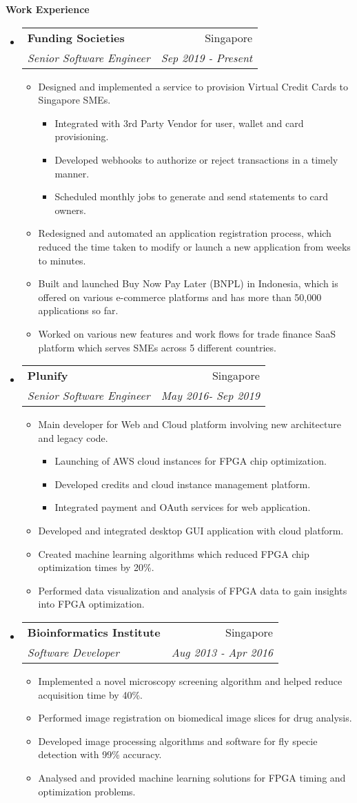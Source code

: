 \documentclass[letterpaper,11pt]{article}
\makeatletter
\newcommand{\resitem}[1]{\item #1 \vspace{-2pt}}
\newcommand{\resheading}[1]{{\large \colorbox{mygrey}{\begin{minipage}{\textwidth}{\textbf{#1 \vphantom{p\^{E}}}}\end{minipage}}}}
\newcommand{\ressubheading}[4]{
\begin{tabular*}{7.0in}{l@{\extracolsep{\fill}}r}
		\textbf{#1} & #2 \\
		\textit{#3} & \textit{#4} \\
\end{tabular*}\vspace{-6pt}}
\makeatother
\begin{document}
\resheading{Work Experience}
\begin{itemize}
\item
	\ressubheading{Funding Societies}{Singapore}{Senior Software Engineer}{Sep 2019 - Present}

	\begin{itemize}
		\resitem{Designed and implemented a service to provision Virtual Credit Cards to Singapore SMEs.}
		 \begin{itemize}
			\resitem{Integrated with 3rd Party Vendor for user,  wallet and card provisioning.}
			\resitem{Developed webhooks to authorize or reject transactions in a timely manner.}
			\resitem{Scheduled monthly jobs to generate and send statements to card owners.}
		\end{itemize}
		\resitem{Redesigned and automated an application registration process,  which reduced the time taken to modify or launch a new application from weeks to minutes.}
		\resitem{Built and launched Buy Now Pay Later (BNPL) in Indonesia, which is offered on various e-commerce platforms and has more than 50,000 applications so far.}
		\resitem{Worked on various new features and work flows for trade finance SaaS platform which serves SMEs across 5 different countries.}
	\end{itemize}


\item
	\ressubheading{Plunify}{Singapore}{Senior Software Engineer}{May 2016- Sep 2019}
	\begin{itemize}
	    \resitem{Main developer for Web and Cloud platform involving new architecture and legacy code.}
	    \begin{itemize}
			\resitem{Launching of AWS cloud instances for FPGA chip optimization.}
			\resitem{Developed credits and cloud instance management platform.}
			\resitem{Integrated payment and OAuth services for web application.}
	    \end{itemize}
	    \resitem{Developed and integrated desktop GUI application with cloud platform.}
		\resitem{Created machine learning algorithms which reduced FPGA chip optimization times by 20\%.}
		\resitem{Performed data visualization and analysis of FPGA data to gain insights into FPGA optimization.}
	\end{itemize}


\item
	\ressubheading{Bioinformatics Institute}{Singapore}{Software Developer}{Aug 2013 - Apr 2016}
	\begin{itemize}
		\resitem{Implemented a novel microscopy screening algorithm and helped reduce acquisition time by 40\%.}
		\resitem{Performed image registration on biomedical image slices for drug analysis.}
		\resitem{Developed image processing algorithms and	 software for fly specie detection with 99\% accuracy.}
		\resitem{Analysed and provided machine learning solutions for FPGA timing and optimization problems.}
	\end{itemize}

\vspace{0.1in}
\end{itemize}
\end{document}
